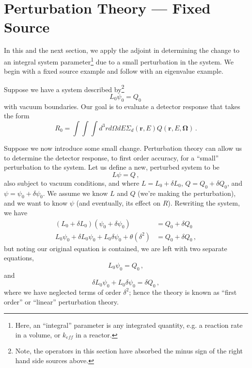 \section*{Perturbation Theory --- Fixed Source}

In this and the next section, we apply the adjoint in determining the change to an integral system parameter\footnote{Here, an ``integral'' parameter is any integrated quantity, e.g. a reaction rate in a volume, or $k_{e\!f\!f}$ in a reactor.} due to a small perturbation in the system.  We begin with a fixed source example and follow with an eigenvalue example.

Suppose we have a system described by\footnote{Note, the operators in this section have absorbed the minus sign of the right hand side sources above.}
\begin{equation}
 L_0 \psi_0 = Q_0 \, 
\end{equation}
with vacuum boundaries.  Our goal is to evaluate a detector response that takes the form
\begin{equation}
 R_0 = \int \int \int d^3r d\Omega dE \Sigma_d(\mathbf{r},E) Q(\mathbf{r},E,\mathbf{\Omega}) \, .
\end{equation}

Suppose we now introduce some small change.  Perturbation theory can allow us to determine the detector response, to first order accuracy, for a ``small'' perturbation to the system.  Let us define a new, perturbed system to be
\begin{equation}
 L \psi = Q \, ,
\end{equation}
also subject to vacuum conditions, and where $L = L_0 + \delta L_0$, $Q = Q_0 + \delta Q_0$, and $\psi = \psi_0 + \delta \psi_0$.  We assume we know $L$ and $Q$ (we're making the perturbation), and we want to know $\psi$ (and eventually, its effect on $R$). Rewriting the system, we have
\begin{equation}
\begin{split}
 ( L_0 + \delta L_0)(\psi_0 + \delta \psi_0) &= Q_0 + \delta Q_0 \\
  L_0 \psi_0 + \delta L_0 \psi_0 + L_0 \delta \psi_0 + \theta(\delta^2) &= Q_0 + \delta Q_0 \, ,
\end{split}
\end{equation}
but noting our original equation is contained, we are left with two separate equations,
\begin{equation}
 L_0 \psi_0 = Q_0 \, ,
 \label{eq:pertzeroth}
\end{equation}
and
\begin{equation}
 \delta L_0 \psi_0 + L_0 \delta \psi_0 = \delta Q_0 \, ,
 \label{eq:pertfirst}
\end{equation}
where we have neglected terms of order $\delta^2$; hence the theory is known as ``first order'' or ``linear'' perturbation theory.

